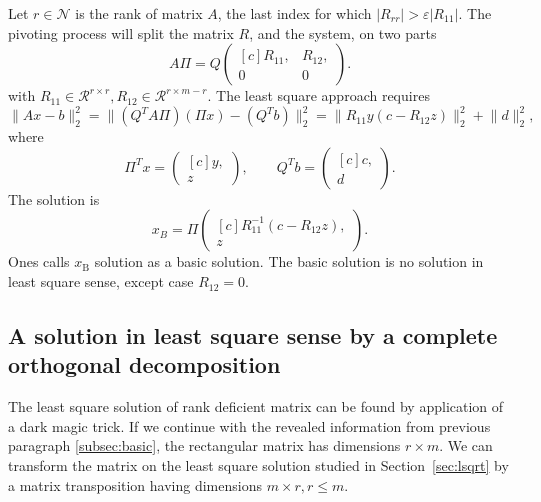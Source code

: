 \begin{refsection}
Let $r \in \mathcal{N}$ is the rank of matrix $A$,
the last index for which
$\lvert R_{rr} \rvert > \varepsilon \lvert R_{11} \rvert$.
The pivoting process will split the matrix $R$, and the system, on two parts
\begin{equation}
  A \Pi = Q
  \begin{pmatrix*}[c]
    R_{11}, & R_{12}, \\
    0 & 0
  \end{pmatrix*}.
\end{equation}
with $R_{11} \in \mathcal{R}^{r \times r}, R_{12} \in \mathcal{R}^{r \times m-r}$.
The least square approach requires
\begin{equation}
  \lVert Ax - b\rVert_2^2 = \lVert (Q^T A \Pi) (\Pi x) - (Q^Tb) \rVert_2^2
  = \lVert R_{11} y (c - R_{12} z) \rVert_2^2 + \lVert  d \rVert_2^2,
\end{equation}
where
\begin{equation}
  \Pi^T x =
  \begin{pmatrix*}[c]
    y,\\
    z
  \end{pmatrix*},
  \qquad
  Q^T b =
  \begin{pmatrix*}[c]
    c,\\
    d
  \end{pmatrix*}.
\end{equation}
The solution is
\begin{equation}
  x_B = \Pi
  \begin{pmatrix*}[c]
    R_{11}^{-1} (c - R_{12} z),\\
    z
  \end{pmatrix*}.
\end{equation}
Ones calls $x_\mathrm{B}$ solution as a basic solution. The basic solution
is no solution in least square sense, except case $R_{12}=0$.


\subsection{A solution in least square sense by a complete orthogonal decomposition}
\label{subsec:lsrank}

The least square solution of rank deficient matrix
can be found by application of a dark magic trick.
If we continue with the revealed information from previous
paragraph \ref{subsec:basic}, the rectangular matrix
has dimensions $r \times m$. We can transform the matrix on the least
square solution studied in Section~\ref{sec:lsqrt} by a matrix transposition
having dimensions $m \times r, r \le m$.


\end{refsection}
